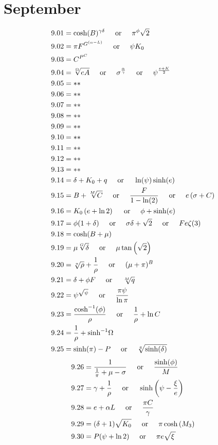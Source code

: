 \documentclass[12pt]{article}
\newcommand{\acosh}{\text{cosh}^{-1}}
\newcommand{\asinh}{\text{sinh}^{-1}}
\newcommand{\oder}{\hspace{5mm}\text{or}\hspace{5mm}}
\begin{document}
\pagebreak
 
\section{September}
\begin{align*}
9.01 &= \cosh(B)^{\gamma \delta} \oder \pi^{\phi}\sqrt{2}\\
9.02 &= \pi F^{G^{(\alpha - L)}} \oder \psi K_{0}\\
9.03 &= C^{P^{C}}\\
9.04 &= \sqrt[\Omega]{e A} \oder \sigma^{\frac{\alpha}{\gamma}} \oder \psi^{\frac{e + K}{2}}\\
9.05 &= **\\
9.06 &= **\\
9.07 &= **\\
9.08 &= **\\
9.09 &= **\\
9.10 &= **\\
9.11 &= **\\
9.12 &= **\\
9.13 &= **\\
9.14 &= \delta+K_{0}+q \oder \ln(\psi) \sinh(e)\\
9.15 &= B+\sqrt[M]{C} \oder \frac{F}{1-\ln(2)} \oder e \left(\sigma+C\right)\\
9.16 &= K_{0} \left(e+\ln{2}\right) \oder \phi+\sinh(e)\\
9.17 &= \phi(1 + \delta) \oder \sigma \delta+\sqrt{2} \oder Fe\zeta(3)\\
9.18 &= \cosh(B+\mu)\\
9.19 &= \mu \sqrt[G]{\delta} \oder \mu \tan\left(\sqrt{2}\right)\\
9.20 &= \sqrt[\pi]{\rho}+\frac{1}{\rho} \oder (\mu + \pi)^{B}\\
9.21 &= \delta+\phi F \oder \sqrt[M]{q}\\
9.22 &= \psi^{\sqrt{\psi}} \oder \frac{\pi \psi}{\ln \pi}\\
9.23 &= \frac{\acosh(\phi)}{\rho} \oder \frac{1}{\rho}+\ln C\\
9.24 &= \frac{1}{\rho}+\asinh\Omega\\
9.25 &= \sinh(\pi)-P \oder \sqrt[q]{\sinh(\delta)}\\
\end{align*}
\pagebreak
\begin{align*}
9.26 &= \frac{1}{\frac{1}{\pi}+\mu-\sigma} \oder \frac{\sinh(\phi)}{M}\\
9.27 &= \gamma+\frac{1}{\rho} \oder \sinh\left(\psi-\frac{\xi}{e}\right)\\
9.28 &= e+\alpha L \oder \frac{\pi C}{\gamma}\\
9.29 &= (\delta+1) \sqrt{K_{0}} \oder \pi \cosh\left(M_{3}\right)\\
9.30 &= P(\psi + \ln2) \oder \pi e \sqrt{\xi\,} \\
\end{align*}
\end{document}
